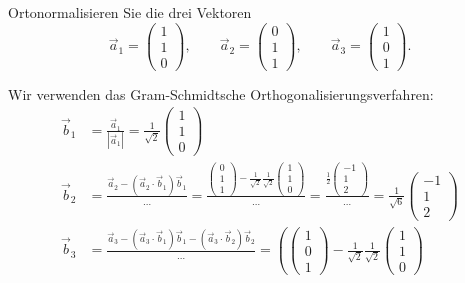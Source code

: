 Ortonormalisieren Sie die drei Vektoren
\[
\vec{a}_1=\begin{pmatrix}1\\1\\0\end{pmatrix},\qquad
\vec{a}_2=\begin{pmatrix}0\\1\\1\end{pmatrix},\qquad
\vec{a}_3=\begin{pmatrix}1\\0\\1\end{pmatrix}.
\]


\begin{loesung}
Wir verwenden das Gram-Schmidtsche Orthogonalisierungsverfahren:
\begin{align*}
\vec{b}_1
&=
\frac{\vec{a}_1}{|\vec{a}_1|}
=
\frac1{\sqrt{2}}\begin{pmatrix}1\\1\\0\end{pmatrix}
\\
\vec{b}_2
&=
\frac{\vec{a}_2 - (\vec{a}_2\cdot\vec{b}_1)\vec{b}_1}{\dots}
=
\frac{\displaystyle\begin{pmatrix}0\\1\\1\end{pmatrix}-\frac1{\sqrt{2}}\frac1{\sqrt{2}}\begin{pmatrix}1\\1\\0\end{pmatrix}}{\dots}
=
\frac{\displaystyle\frac12\begin{pmatrix}-1\\1\\2\end{pmatrix}}{\dots}
=
\frac{1}{\sqrt{6}}\begin{pmatrix}-1\\1\\2\end{pmatrix}
\\
\vec{b}_3
&=
\frac{\vec{a}_3-(\vec{a}_3\cdot\vec{b}_1)\vec{b}_1-(\vec{a}_3\cdot\vec{b}_2)\vec{b}_2}{\dots}
=
\left(
\begin{pmatrix}1\\0\\1\end{pmatrix}
-\frac1{\sqrt{2}}\frac1{\sqrt{2}}\begin{pmatrix}1\\1\\0\end{pmatrix}

\end{align*}
\end{loesung}
